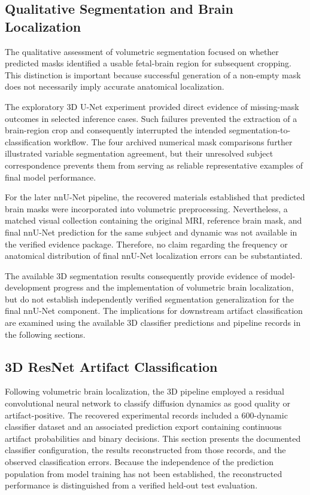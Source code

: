 \subsection{Qualitative Segmentation and Brain Localization}
\label{subsec:3d_segmentation_qualitative}

The qualitative assessment of volumetric segmentation focused on whether predicted masks identified a usable fetal-brain region for subsequent cropping. This distinction is important because successful generation of a non-empty mask does not necessarily imply accurate anatomical localization.

The exploratory 3D U-Net experiment provided direct evidence of missing-mask outcomes in selected inference cases. Such failures prevented the extraction of a brain-region crop and consequently interrupted the intended segmentation-to-classification workflow. The four archived numerical mask comparisons further illustrated variable segmentation agreement, but their unresolved subject correspondence prevents them from serving as reliable representative examples of final model performance.

For the later nnU-Net pipeline, the recovered materials established that predicted brain masks were incorporated into volumetric preprocessing. Nevertheless, a matched visual collection containing the original MRI, reference brain mask, and final nnU-Net prediction for the same subject and dynamic was not available in the verified evidence package. Therefore, no claim regarding the frequency or anatomical distribution of final nnU-Net localization errors can be substantiated.

The available 3D segmentation results consequently provide evidence of model-development progress and the implementation of volumetric brain localization, but do not establish independently verified segmentation generalization for the final nnU-Net component. The implications for downstream artifact classification are examined using the available 3D classifier predictions and pipeline records in the following sections.

\subsection{3D ResNet Artifact Classification}
\label{sec:results_3d_classification}

Following volumetric brain localization, the 3D pipeline employed a residual convolutional neural network to classify diffusion dynamics as good quality or artifact-positive. The recovered experimental records included a 600-dynamic classifier dataset and an associated prediction export containing continuous artifact probabilities and binary decisions. This section presents the documented classifier configuration, the results reconstructed from those records, and the observed classification errors. Because the independence of the prediction population from model training has not been established, the reconstructed performance is distinguished from a verified held-out test evaluation.

